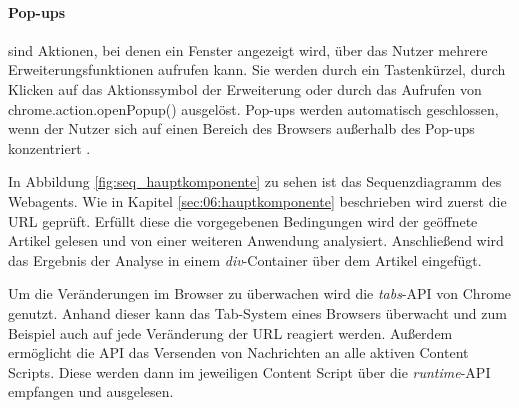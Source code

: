 \paragraph{Pop-ups} sind Aktionen, bei denen ein Fenster angezeigt wird, über das Nutzer mehrere Erweiterungsfunktionen aufrufen kann. 
Sie werden durch ein Tastenkürzel, durch Klicken auf das Aktionssymbol der Erweiterung oder durch das Aufrufen von \\ chrome.action.openPopup() ausgelöst. 
Pop-ups werden automatisch geschlossen, wenn der Nutzer sich auf einen Bereich des Browsers außerhalb des Pop-ups konzentriert \cite{chrome2025popups}.

In Abbildung \ref{fig:seq_hauptkomponente} zu sehen ist das Sequenzdiagramm des Webagents. Wie in Kapitel \ref{sec:06:hauptkomponente} beschrieben
wird zuerst die URL geprüft. Erfüllt diese die vorgegebenen Bedingungen wird der geöffnete Artikel gelesen und von einer weiteren Anwendung
analysiert. Anschließend wird das Ergebnis der Analyse in einem \textit{div}-Container über dem Artikel eingefügt.

Um die Veränderungen im Browser zu überwachen wird die \textit{tabs}-API von Chrome genutzt. Anhand dieser kann das Tab-System eines Browsers überwacht
und zum Beispiel auch auf jede Veränderung der URL reagiert werden.
Außerdem ermöglicht die API das Versenden von Nachrichten an alle aktiven Content Scripts. Diese werden dann im jeweiligen Content Script über die
\textit{runtime}-API empfangen und ausgelesen.


